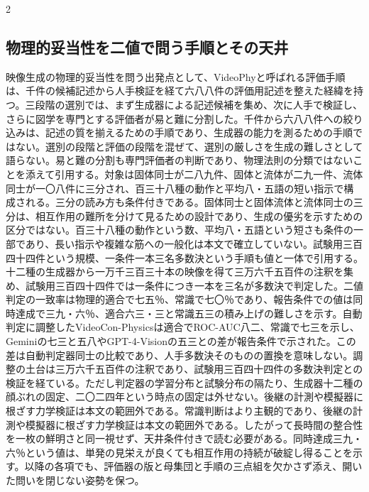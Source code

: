 \documentclass[lualatex,a4paper,10pt]{jlreq}
\begin{document}
\begin{multicols}{2}
\subsection{物理的妥当性を二値で問う手順とその天井}
映像生成の物理的妥当性を問う出発点として、VideoPhyと呼ばれる評価手順は、千件の候補記述から人手検証を経て六八八件の評価用記述を整えた経緯を持つ。三段階の選別では、まず生成器による記述候補を集め、次に人手で検証し、さらに図学を専門とする評価者が易と難に分割した\autocite{btd131}。千件から六八八件への絞り込みは、記述の質を揃えるための手順であり、生成器の能力を測るための手順ではない。選別の段階と評価の段階を混ぜて、選別の厳しさを生成の難しさとして語らない。易と難の分割も専門評価者の判断であり、物理法則の分類ではないことを添えて引用する。対象は固体同士が二八九件、固体と流体が二九一件、流体同士が一〇八件に三分され、百三十八種の動作と平均八・五語の短い指示で構成される\autocite{btd131}。三分の読み方も条件付きである。固体同士と固体流体と流体同士の三分は、相互作用の難所を分けて見るための設計であり、生成の優劣を示すための区分ではない。百三十八種の動作という数、平均八・五語という短さも条件の一部であり、長い指示や複雑な筋への一般化は本文で確立していない。試験用三百四十四件という規模、一条件一本三名多数決という手順も値と一体で引用する\autocite{btd131}。十二種の生成器から一万千三百三十本の映像を得て三万六千五百件の注釈を集め、試験用三百四十四件では一条件につき一本を三名が多数決で判定した。二値判定の一致率は物理的適合で七五％、常識で七〇％であり、報告条件での値は同時達成で三九・六％、適合六三・三と常識五三の積み上げの難しさを示す。自動判定に調整したVideoCon-Physicsは適合でROC-AUC八二、常識で七三を示し、Geminiの七三と五八やGPT-4-Visionの五三との差が報告条件で示された\autocite{btd131}。この差は自動判定器同士の比較であり、人手多数決そのものの置換を意味しない。調整の土台は三万六千五百件の注釈であり、試験用三百四十四件の多数決判定との検証を経ている。ただし判定器の学習分布と試験分布の隔たり、生成器十二種の顔ぶれの固定、二〇二四年という時点の固定は外せない。後継の計測や模擬器に根ざす力学検証は本文の範囲外である\autocite{btd131}。常識判断はより主観的であり、後継の計測や模擬器に根ざす力学検証は本文の範囲外である。したがって長時間の整合性を一枚の鮮明さと同一視せず、天井条件付きで読む必要がある。同時達成三九・六％という値は、単発の見栄えが良くても相互作用の持続が破綻し得ることを示す。以降の各項でも、評価器の版と母集団と手順の三点組を欠かさず添え、開いた問いを閉じない姿勢を保つ。


\end{multicols}
\end{document}
